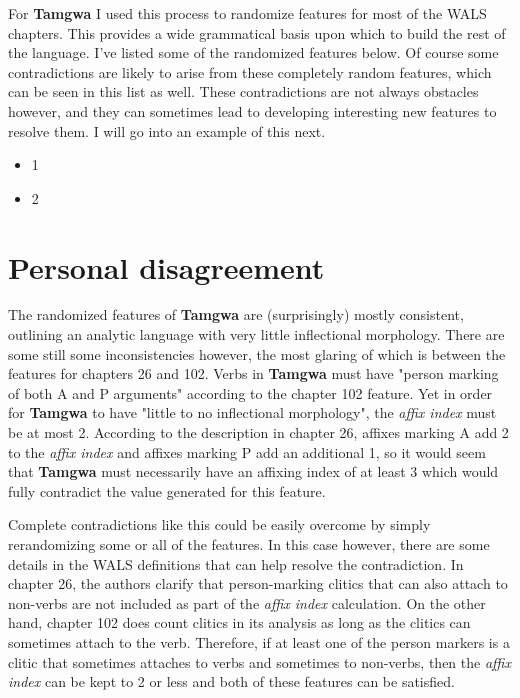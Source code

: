 \documentclass[a4paper,12pt,twoside,openright]{memoir}
\begin{document}
    For \textbf{Tamgwa} I used this process to randomize features for most of the WALS chapters.  This provides a wide grammatical basis upon which to build the rest of the language.  I've listed some of the randomized features below.  Of course some contradictions are likely to arise from these completely random features, which can be seen in this list as well.  These contradictions are not always obstacles however, and they can sometimes lead to developing interesting new features to resolve them.  I will go into an example of this next.

\begin{itemize}
    \item 1
    \item 2
\end{itemize}

\section*{Personal disagreement} %

    The randomized features of \textbf{Tamgwa} are (surprisingly) mostly consistent, outlining an analytic language with very little inflectional morphology.  There are some still some inconsistencies however, the most glaring of which is between the features for chapters 26 and 102.  Verbs in \textbf{Tamgwa} must have "person marking of both A and P arguments" according to the chapter 102 feature.  Yet in order for \textbf{Tamgwa} to have "little to no inflectional morphology", the \textit{affix index} must be at most 2.  According to the description in chapter 26, affixes marking A add 2 to the \textit{affix index} and affixes marking P add an additional 1, so it would seem that \textbf{Tamgwa} must necessarily have an affixing index of at least 3 which would fully contradict the value generated for this feature.

    Complete contradictions like this could be easily overcome by simply rerandomizing some or all of the features.  In this case however, there are some details in the WALS definitions that can help resolve the contradiction.  In chapter 26, the authors clarify that person-marking clitics that can also attach to non-verbs are not included as part of the \textit{affix index} calculation.  On the other hand, chapter 102 does count clitics in its analysis as long as the clitics can sometimes attach to the verb.  Therefore, if at least one of the person markers is a clitic that sometimes attaches to verbs and sometimes to non-verbs, then the \textit{affix index} can be kept to 2 or less and both of these features can be satisfied.
\end{document}
